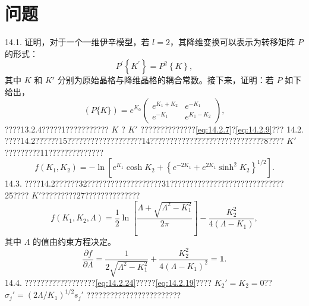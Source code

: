 \section{问题}\label{ux95eeux9898_chap14}
14.1. 证明，对于一个一维伊辛模型，若 \(l=2\)，其降维变换可以表示为转移矩阵 \(P\) 的形式：
\begin{equation}\tag{14.4.107}\label{eq:14.4.107}
P ^{\prime} \left\{ K ^{\prime} \right\} = P ^{2} \left\{ K \right\} ,
\end{equation}
其中 \(K\) 和 \(K'\) 分别为原始晶格与降维晶格的耦合常数。接下来，证明：若 \(P\) 如下给出，
\begin{equation}\tag{14.4.108}\label{eq:14.4.108}
( P \{ K \} ) = e ^{K _ { 0} } \left( \begin{array}{cc} { { e ^{K _ { 1} + K _ { 2 } } } } & { { e ^{- K _ { 1} } } } \\{ { e ^{- K _ { 1} } } } & { { e ^{K _ { 1} - K _ { 2 } } } } \end{array} \right) ,
\end{equation}
????13.2.4?????1??????????? \(K\) ? \(K\prime\) ??????????????\autoref{eq:14.2.7}?\autoref{eq:14.2.9}???
14.2. ????14.2??????15???????????????????14?????????????????????????????8???? \(K\prime\)?????????11??????????????
\begin{equation}\tag{14.4.109}\label{eq:14.4.109}
f ( K _ { 1 } , K _ { 2 } ) = - \ln \left[ e ^{K _ { 1} } \cosh K _ { 2 } + \left\{ e ^{- 2 K _ { 1} } + e ^{2 K _ { 1} } \sinh ^{2} K _ { 2 } \right\} ^{1 / 2} \right] .
\end{equation}
14.3. ????14.2??????32???????????????????31?????????????????????????????25???? \(K\prime\)?????????27??????????????
\begin{equation}\tag{14.4.110}\label{eq:14.4.110}
f ( K _ { 1 } , K _ { 2 } , \Lambda ) = \frac { 1 } { 2 } \ln \left[ \frac { \Lambda + \sqrt { \Lambda ^{2} - K _ { 1 } ^{2} } } { 2 \pi } \right] - \frac { K _ { 2 } ^{2} } { 4 ( \Lambda - K _ { 1 } ) } ,
\end{equation}
其中 \(\Lambda\) 的值由约束方程决定。
\begin{equation}\tag{14.4.111}\label{eq:14.4.111}
\frac { \partial f } { \partial \Lambda } = \frac { 1 } { 2 \sqrt { \Lambda ^{2} - K _ { 1 } ^{2} } } + \frac { K _ { 2 } ^{2} } { 4 \left( \Lambda - K _ { 1 } \right) ^{2} } = \mathbf { 1 } .
\end{equation}
14.4. ??????????????????\autoref{eq:14.2.24}?????\autoref{eq:14.2.19}???? \(K_2\prime = K_2 = 0\)?? \(\sigma_j\prime = (2\Lambda/K_1)^{1/2}s_j\prime\) ????????????????????????
